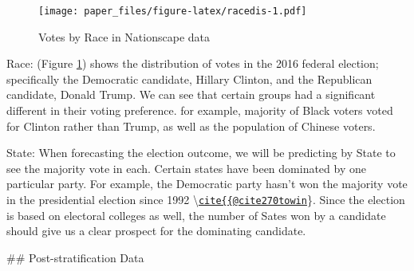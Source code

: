 \documentclass[
]{article}
\begin{document}
\begin{figure}
\centering
\texttt{[image: paper\_files/figure-latex/racedis-1.pdf]}
\caption{\label{fig:racedis}Votes by Race in Nationscape data}
\end{figure}

Race: (Figure \ref{fig:racedis}) shows the distribution of votes in the 2016 federal election; specifically the Democratic candidate, Hillary Clinton, and the Republican candidate, Donald Trump. We can see that certain groups had a significant different in their voting preference. for example, majority of Black voters voted for Clinton rather than Trump, as well as the population of Chinese voters.

State: When forecasting the election outcome, we will be predicting by State to see the majority vote in each. Certain states have been dominated by one particular party. For example, the Democratic party hasn't won the majority vote in the presidential election since 1992 \textbackslash{}\href{mailto:cite\%7B\%7B@cite270towin}{\nolinkurl{cite\{\{@cite270towin}}\}. Since the election is based on electoral colleges as well, the number of Sates won by a candidate should give us a clear prospect for the dominating candidate.

\#\# Post-stratification Data
\end{document}
